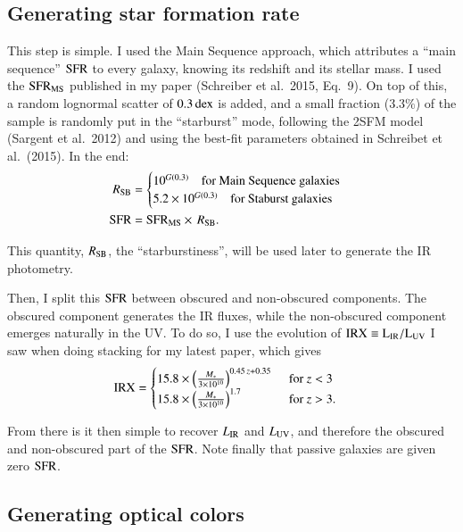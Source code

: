 \documentclass[12pt,a4paper]{article}
\newcommand{\sfr}{{\rm SFR}}
\newcommand{\lir}{L_{\rm IR}}
\newcommand{\irx}{\rm IRX}
\newcommand{\luv}{L_{\rm UV}}
\newcommand{\dex}{{\rm dex}}
\newcommand{\mstar}{M_\ast}
\newcommand{\rsb}{R_{\rm SB}}
\begin{document}
\subsection{Generating star formation rate \label{SEC:sfr}}

This step is simple. I used the Main Sequence approach, which attributes a ``main sequence'' $\sfr$ to every galaxy, knowing its redshift and its stellar mass. I used the $\sfr_{\rm MS}$ published in my paper (Schreiber et al.~2015, Eq.~9). On top of this, a random lognormal scatter of $0.3\,\dex$ is added, and a small fraction ($3.3\%$) of the sample is randomly put in the ``starburst'' mode, following the 2SFM model (Sargent et al.~2012) and using the best-fit parameters obtained in Schreibet et al.~(2015). In the end:
\begin{align}
\rsb &= \begin{cases}
10^{G(0.3)} \quad\text{for Main Sequence galaxies} \\
5.2 \times 10^{G(0.3)} \quad\text{for Staburst galaxies} \\
\end{cases} \\
\sfr &= \sfr_{\rm MS} \times \, \rsb.
\end{align}

This quantity, $\rsb$, the ``starburstiness'', will be used later to generate the IR photometry.

Then, I split this $\sfr$ between obscured and non-obscured components. The obscured component generates the IR fluxes, while the non-obscured component emerges naturally in the UV. To do so, I use the evolution of $\irx \equiv \lir/\luv$ I saw when doing stacking for my latest paper, which gives
\begin{align}
\irx &= \begin{cases}
15.8 \times \left(\frac{\mstar}{3 \times 10^{10}}\right)^{0.45\, z + 0.35}\,\
&\text{for $z<3$} \\
15.8 \times \left(\frac{\mstar}{3 \times 10^{10}}\right)^{1.7}\,&\text{for $z>3$.}
\end{cases}
\end{align}

From there is it then simple to recover $\lir$ and $\luv$, and therefore the obscured and non-obscured part of the $\sfr$. Note finally that passive galaxies are given zero $\sfr$.


\subsection{Generating optical colors}
\end{document}
